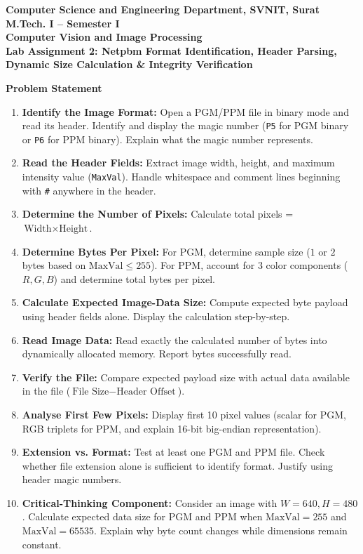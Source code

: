 \documentclass[12pt]{article}
\begin{document}
\begin{center}
\textbf{Computer Science and Engineering Department, SVNIT, Surat}\\
\textbf{M.Tech. I -- Semester I}\\
\textbf{Computer Vision and Image Processing}\\
\textbf{Lab Assignment 2: Netpbm Format Identification, Header Parsing, Dynamic Size Calculation \& Integrity Verification}
\end{center}

\vspace{0.4cm}

\textbf{Problem Statement}

\begin{enumerate}
    \item \textbf{Identify the Image Format:} Open a PGM/PPM file in binary mode and read its header. Identify and display the magic number (\texttt{P5} for PGM binary or \texttt{P6} for PPM binary). Explain what the magic number represents.
    \item \textbf{Read the Header Fields:} Extract image width, height, and maximum intensity value (\texttt{MaxVal}). Handle whitespace and comment lines beginning with \texttt{\#} anywhere in the header.
    \item \textbf{Determine the Number of Pixels:} Calculate total pixels = $\text{Width} \times \text{Height}$.
    \item \textbf{Determine Bytes Per Pixel:} For PGM, determine sample size ($1$ or $2$ bytes based on $\text{MaxVal} \le 255$). For PPM, account for $3$ color components ($R, G, B$) and determine total bytes per pixel.
    \item \textbf{Calculate Expected Image-Data Size:} Compute expected byte payload using header fields alone. Display the calculation step-by-step.
    \item \textbf{Read Image Data:} Read exactly the calculated number of bytes into dynamically allocated memory. Report bytes successfully read.
    \item \textbf{Verify the File:} Compare expected payload size with actual data available in the file ($\text{File Size} - \text{Header Offset}$).
    \item \textbf{Analyse First Few Pixels:} Display first 10 pixel values (scalar for PGM, RGB triplets for PPM, and explain 16-bit big-endian representation).
    \item \textbf{Extension vs. Format:} Test at least one PGM and PPM file. Check whether file extension alone is sufficient to identify format. Justify using header magic numbers.
    \item \textbf{Critical-Thinking Component:} Consider an image with $W=640, H=480$. Calculate expected data size for PGM and PPM when $\text{MaxVal}=255$ and $\text{MaxVal}=65535$. Explain why byte count changes while dimensions remain constant.
\end{enumerate}
\end{document}
